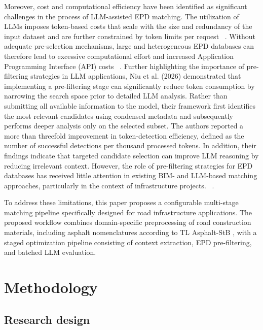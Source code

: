 \documentclass[10pt, a4paper, twocolumn]{article}
\begin{document}
Moreover, cost and computational efficiency have been identified as significant challenges in the process of LLM-assisted EPD matching. The utilization of LLMs imposes token-based costs that scale with the size and redundancy of the input dataset and are further constrained by token limits per request ~\cite{Petrosa.2025}. Without adequate pre-selection mechanisms, large and heterogeneous EPD databases can therefore lead to excessive computational effort and increased Application Programming Interface (API) costs  ~\cite{Petrosa.2025}. Further highlighting the importance of pre-filtering strategies in LLM applications, Niu et al. (2026) demonstrated that implementing a pre-filtering stage can significantly reduce token consumption by narrowing the search space prior to detailed LLM analysis. Rather than submitting all available information to the model, their framework first identifies the most relevant candidates using condensed metadata and subsequently performs deeper analysis only on the selected subset. The authors reported a more than threefold improvement in token-detection efficiency, defined as the number of successful detections per thousand processed tokens. In addition, their findings indicate that targeted candidate selection can improve LLM reasoning by reducing irrelevant context. However, the role of pre-filtering strategies for EPD databases has received little attention in existing BIM- and LLM-based matching approaches, particularly in the context of infrastructure projects. ~\cite{Niu.2026}.  

To address these limitations, this paper proposes a configurable multi-stage matching pipeline specifically designed for road infrastructure applications. The proposed workflow combines domain-specific preprocessing of road construction materials, including asphalt nomenclatures according to TL Asphalt-StB \cite{TLAsphaltStB.2013}, with a staged optimization pipeline consisting of context extraction, EPD pre-filtering, and batched LLM evaluation.


\section{Methodology}

\subsection{Research design}
\end{document}
